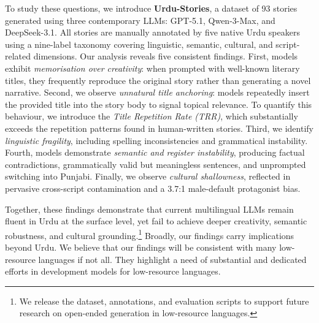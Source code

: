 \documentclass[11pt]{article}
\begin{document}
To study these questions, we introduce \textbf{Urdu-Stories}, a dataset of 93 stories generated using three contemporary LLMs: GPT-5.1, Qwen-3-Max, and DeepSeek-3.1. All stories are manually annotated by five native Urdu speakers using a nine-label taxonomy covering linguistic, semantic, cultural, and script-related dimensions. Our analysis reveals five consistent findings. First, models exhibit \textit{memorisation over creativity}: when prompted with well-known literary titles, they frequently reproduce the original story rather than generating a novel narrative. Second, we observe \textit{unnatural title anchoring}: models repeatedly insert the provided title into the story body to signal topical relevance. To quantify this behaviour, we introduce the \textit{Title Repetition Rate (TRR)}, which substantially exceeds the repetition patterns found in human-written stories. Third, we identify \textit{linguistic fragility}, including spelling inconsistencies and grammatical instability. Fourth, models demonstrate \textit{semantic and register instability}, producing factual contradictions, grammatically valid but meaningless sentences, and unprompted switching into Punjabi. Finally, we observe \textit{cultural shallowness}, reflected in pervasive cross-script contamination and a 3.7:1 male-default protagonist bias.

Together, these findings demonstrate that current multilingual LLMs remain fluent in Urdu at the surface level, yet fail to achieve deeper creativity, semantic robustness, and cultural grounding.\footnote{We release the dataset, annotations, and evaluation scripts to support future research on open-ended generation in low-resource languages.}
Broadly, our findings carry implications beyond Urdu. We believe that our findings will be consistent with many low-resource languages if not all. They highlight a need of substantial and dedicated efforts in development models for low-resource languages.



\end{document}
